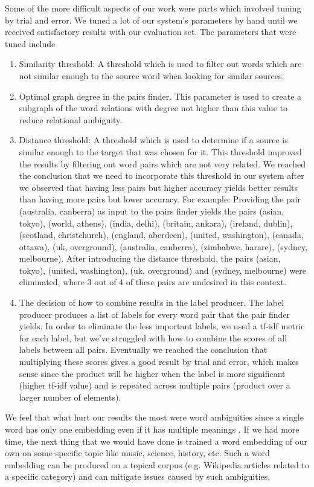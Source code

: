 \documentclass[11pt,a4paper]{article}
\begin{document}
Some of the more difficult aspects of our work were parts which involved tuning by trial and error. We tuned a lot of our system's parameters by hand until we received satisfactory results with our evaluation set. The parameters that were tuned include
\begin{enumerate}
\item Similarity threshold: A threshold which is used to filter out words which are not similar enough to the source word when looking for similar sources.
\item Optimal graph degree in the pairs finder. This parameter is used to create a subgraph of the word relations with degree not higher than this value to reduce relational ambiguity.
\item Distance threshold: A threshold which is used to determine if a source is similar enough to the target that was chosen for it. This threshold improved the results by filtering out word pairs which are not very related. We reached the conclusion that we need to incorporate this threshold in our system after we observed that having less pairs but higher accuracy yields better results than having more pairs but lower accuracy.
For example: Providing the pair (australia, canberra) as input to the pairs finder yields the pairs (asian, tokyo), (world, athens), (india, delhi), (britain, ankara), (ireland, dublin), (scotland, christchurch), (england, aberdeen), (united, washington), (canada, ottawa), (uk, overground), (australia, canberra), (zimbabwe, harare), (sydney, melbourne). After introducing the distance threshold, the pairs (asian, tokyo), (united, washington), (uk, overground) and (sydney, melbourne) were eliminated, where 3 out of 4 of these pairs are undesired in this context.

\item The decision of how to combine results in the label producer. The label producer produces a list of labels for every word pair that the pair finder yields. In order to eliminate the less important labels, we used a tf-idf metric for each label, but we've struggled with how to combine the scores of all labels between all pairs. Eventually we reached the conclusion that multiplying these scores gives a good result by trial and error, which makes sense since the product will be higher when the label is more significant (higher tf-idf value) and is repeated across multiple pairs (product over a larger number of elements).
\end{enumerate}


We feel that what hurt our results the most were word ambiguities since a single word has only one embedding even if it has multiple meanings \cite{shi2017jointly}. 
If we had more time, the next thing that we would have done is trained a word embedding of our own on some specific topic like music, science, history, etc. Such a word embedding can be produced on a topical corpus (e.g. Wikipedia articles related to a specific category) and can mitigate issues caused by such ambiguities.


%
%
%




\appendix
\end{document}
